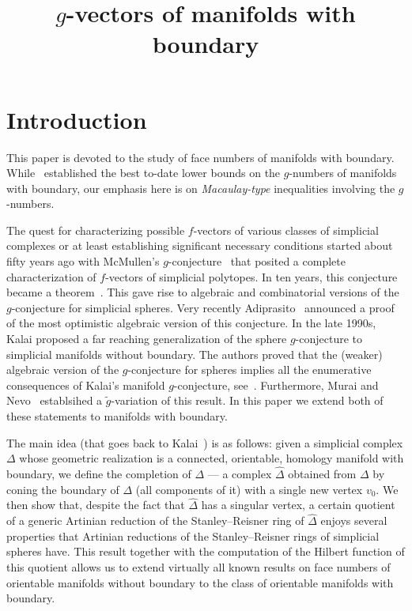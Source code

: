 \documentclass[ALCO,ThmDefs,Unicode,epreuves]{cedram}
\author{\firstname{Isabella} \lastname{Novik}}
\author{\firstname{Ed} \lastname{Swartz}}
\title{$g$-vectors of manifolds with boundary}
\newcommand{\complet}[1]{\hat{#1}}
\begin{document}
\maketitle

\section{Introduction} \label{sec:Intro}

This paper is devoted to the study of face numbers of manifolds with boundary. While~\cite{Murai-Novik-bdry} established the best to-date lower bounds on the $g$-numbers of manifolds with boundary, our emphasis here is on \emph{Macaulay-type} inequalities involving the $g$-numbers.

The quest for characterizing possible $f$-vectors of various classes of simplicial complexes or at least establishing significant necessary conditions started about fifty years ago with McMullen's $g$-conjecture~\cite{McMullen-71} that posited a complete characterization of $f$-vectors of simplicial polytopes. In ten years, this conjecture became a theorem~\cite{Billera-Lee-81, Stanley-80}. This gave rise to algebraic and combinatorial versions of the $g$-conjecture for simplicial spheres. Very recently Adiprasito~\cite{Adiprasito-g} announced a proof of the most optimistic algebraic version of this conjecture. In the late 1990s, Kalai proposed a far reaching generalization of the sphere $g$-conjecture to simplicial manifolds without boundary. The authors proved that the (weaker) algebraic version of the $g$-conjecture for spheres implies all the enumerative consequences of Kalai's manifold $g$-conjecture, see~\cite{Novik-Swartz-09:Gorenstein}. Furthermore, Murai and Nevo~\cite{Murai-Nevo-14} establsihed a $\tilde{g}$-variation of this result. In this paper we extend both of these statements to manifolds with boundary.

The main idea (that goes back to Kalai~\cite[Section~11]{Kalai-87}) is as follows: given a simplicial complex $\Delta$ whose geometric realization is a connected, orientable, homology manifold with boundary, we define the completion of $\Delta$ --- a complex $\complet{\Delta}$ obtained from $\Delta$ by coning the boundary of $\Delta$ (all components of it) with a single new vertex $v_0$. We then show that, despite the fact that $\hat{\Delta}$ has a singular vertex, a certain quotient of a generic Artinian reduction of the Stanley--Reisner ring of $\hat{\Delta}$ enjoys several properties that Artinian reductions of the Stanley--Reisner rings of simplicial spheres have. This result together with the computation of the Hilbert function of this quotient allows us to extend virtually all known results on face numbers of orientable manifolds without boundary to the class of orientable manifolds with boundary.
\end{document}
